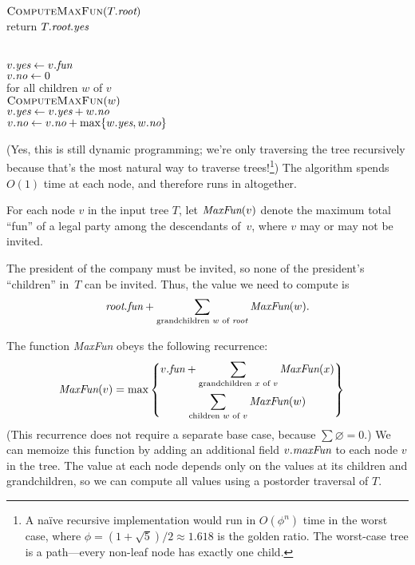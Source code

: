 \documentclass[11pt]{article}
\begin{document}
\begin{enumerate}
\begin{solution}
\begin{center}\small
\begin{algorithm}
	\+
\\	$\textsc{ComputeMaxFun}(T.\emph{root})$
\\	return $T.\emph{root}.\emph{yes}$
\end{algorithm}
\qquad
\begin{algorithm}
	\+
\\	$v.\emph{yes} \gets v.\emph{fun}$
\\	$v.\emph{no} \gets 0$
\\	for all children $w$ of $v$\+
\\		$\textsc{ComputeMaxFun}(w)$
\\		$v.\emph{yes} \gets v.\emph{yes} + w.\emph{no}$
\\		$v.\emph{no} \gets v.\emph{no} + \max\{ w.\emph{yes}, w.\emph{no} \}$
\end{algorithm}
\end{center}
(Yes, this is still dynamic programming; we’re only traversing the tree recursively because that’s the most natural way to traverse trees!\footnote{A naïve recursive implementation would run in $O(\phi^n)$ time in the worst case, where $\phi = (1+\sqrt{5})/2 \approx 1.618$ is the golden ratio.  The worst-case tree is a path—every non-leaf node has exactly one child.})  The algorithm spends $O(1)$ time at each node, and therefore runs in  altogether.
\end{solution}


\newpage
\begin{solution}
For each node $v$ in the input tree $T$, let $\emph{MaxFun}(v)$ denote the maximum total “fun” of a legal party among the descendants of~$v$, where $v$ may or may not be invited.

The president of the company must be invited, so none of the president’s “children” in~$T$ can be invited. Thus, the value we need to compute is 
\[
	\emph{root}.\emph{fun} + \sum_{\text{grandchildren $w$ of \emph{root}}} \emph{MaxFun}(w).
\]

The function \emph{MaxFun} obeys the following recurrence:
\begin{align*}
	\emph{MaxFun}(v)
	&=
	\max\left\{ \begin{gathered}
		v.\emph{fun}
		+
		\sum_{\text{grandchildren $x$ of $v$}} \emph{MaxFun}(x)
		\\
		\sum_{\text{children $w$ of $v$}} \emph{MaxFun}(w)
	\end{gathered} \right\}
\end{align*}
(This recurrence does not require a separate base case, because $\sum\varnothing = 0$.)  We can memoize this function by adding an additional field $v.\emph{maxFun}$ to each node $v$ in the tree.  The value at each node depends only on the values at its children and grandchildren, so we can compute all values using a postorder traversal of $T$.


\end{solution}
\end{enumerate}
\end{document}
